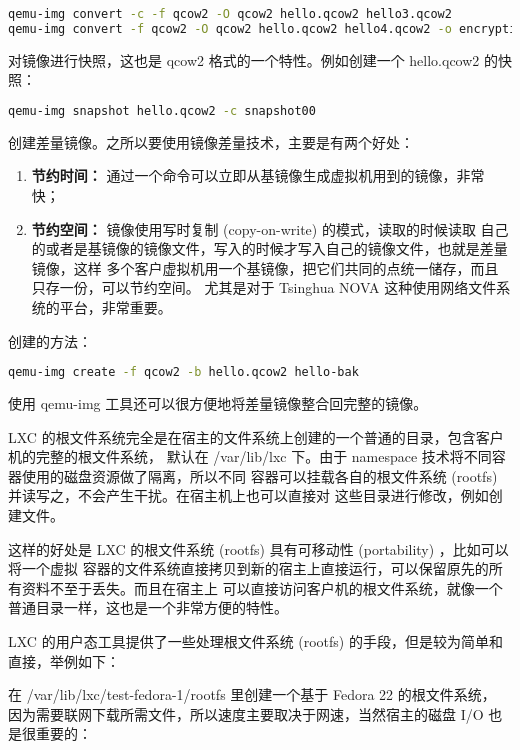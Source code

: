\begin{lstlisting}[language=bash]
qemu-img convert -c -f qcow2 -O qcow2 hello.qcow2 hello3.qcow2
qemu-img convert -f qcow2 -O qcow2 hello.qcow2 hello4.qcow2 -o encryption
\end{lstlisting}

对镜像进行快照，这也是 qcow2 格式的一个特性。例如创建一个 hello.qcow2 的快照：

\begin{lstlisting}[language=bash]
qemu-img snapshot hello.qcow2 -c snapshot00
\end{lstlisting}

创建差量镜像。之所以要使用镜像差量技术，主要是有两个好处：

\begin{enumerate}
    \item \textbf{节约时间：} 通过一个命令可以立即从基镜像生成虚拟机用到的镜像，非常快；
    \item \textbf{节约空间：} 镜像使用写时复制 (copy-on-write) 的模式，读取的时候读取
    自己的或者是基镜像的镜像文件，写入的时候才写入自己的镜像文件，也就是差量镜像，这样
    多个客户虚拟机用一个基镜像，把它们共同的点统一储存，而且只存一份，可以节约空间。
    尤其是对于 Tsinghua NOVA 这种使用网络文件系统的平台，非常重要。
\end{enumerate}

创建的方法：

\begin{lstlisting}[language=bash]
qemu-img create -f qcow2 -b hello.qcow2 hello-bak
\end{lstlisting}

使用 qemu-img 工具还可以很方便地将差量镜像整合回完整的镜像。

LXC 的根文件系统完全是在宿主的文件系统上创建的一个普通的目录，包含客户机的完整的根文件系统，
默认在 /var/lib/lxc 下。由于 namespace 技术将不同容器使用的磁盘资源做了隔离，所以不同
容器可以挂载各自的根文件系统 (rootfs) 并读写之，不会产生干扰。在宿主机上也可以直接对
这些目录进行修改，例如创建文件。

这样的好处是 LXC 的根文件系统 (rootfs) 具有可移动性 (portability) ，比如可以将一个虚拟
容器的文件系统直接拷贝到新的宿主上直接运行，可以保留原先的所有资料不至于丢失。而且在宿主上
可以直接访问客户机的根文件系统，就像一个普通目录一样，这也是一个非常方便的特性。

LXC 的用户态工具提供了一些处理根文件系统 (rootfs) 的手段，但是较为简单和直接，举例如下：

在 /var/lib/lxc/test-fedora-1/rootfs 里创建一个基于 Fedora 22 的根文件系统，
因为需要联网下载所需文件，所以速度主要取决于网速，当然宿主的磁盘 I/O 也是很重要的：


